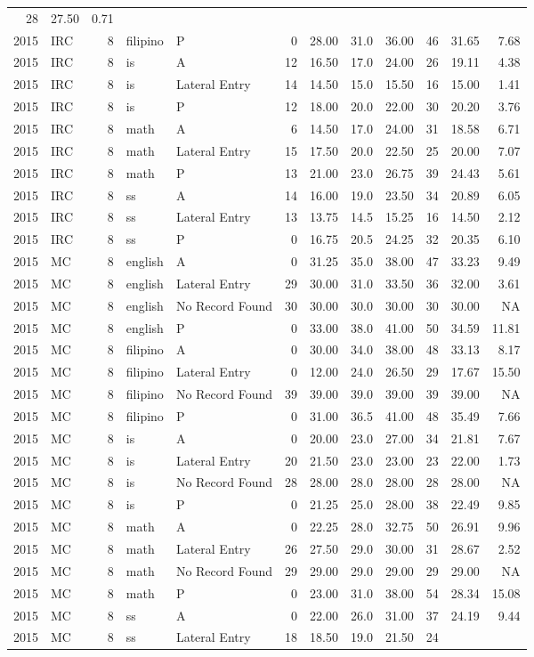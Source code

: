 \documentclass[]{article}
\begin{document}
\begin{longtable}[]{@{}rlrllrrrrrrr@{}}
28 & 27.50 & 0.71\tabularnewline
2015 & IRC & 8 & filipino & P & 0 & 28.00 & 31.0 & 36.00 & 46 & 31.65 &
7.68\tabularnewline
2015 & IRC & 8 & is & A & 12 & 16.50 & 17.0 & 24.00 & 26 & 19.11 &
4.38\tabularnewline
2015 & IRC & 8 & is & Lateral Entry & 14 & 14.50 & 15.0 & 15.50 & 16 &
15.00 & 1.41\tabularnewline
2015 & IRC & 8 & is & P & 12 & 18.00 & 20.0 & 22.00 & 30 & 20.20 &
3.76\tabularnewline
2015 & IRC & 8 & math & A & 6 & 14.50 & 17.0 & 24.00 & 31 & 18.58 &
6.71\tabularnewline
2015 & IRC & 8 & math & Lateral Entry & 15 & 17.50 & 20.0 & 22.50 & 25 &
20.00 & 7.07\tabularnewline
2015 & IRC & 8 & math & P & 13 & 21.00 & 23.0 & 26.75 & 39 & 24.43 &
5.61\tabularnewline
2015 & IRC & 8 & ss & A & 14 & 16.00 & 19.0 & 23.50 & 34 & 20.89 &
6.05\tabularnewline
2015 & IRC & 8 & ss & Lateral Entry & 13 & 13.75 & 14.5 & 15.25 & 16 &
14.50 & 2.12\tabularnewline
2015 & IRC & 8 & ss & P & 0 & 16.75 & 20.5 & 24.25 & 32 & 20.35 &
6.10\tabularnewline
2015 & MC & 8 & english & A & 0 & 31.25 & 35.0 & 38.00 & 47 & 33.23 &
9.49\tabularnewline
2015 & MC & 8 & english & Lateral Entry & 29 & 30.00 & 31.0 & 33.50 & 36
& 32.00 & 3.61\tabularnewline
2015 & MC & 8 & english & No Record Found & 30 & 30.00 & 30.0 & 30.00 &
30 & 30.00 & NA\tabularnewline
2015 & MC & 8 & english & P & 0 & 33.00 & 38.0 & 41.00 & 50 & 34.59 &
11.81\tabularnewline
2015 & MC & 8 & filipino & A & 0 & 30.00 & 34.0 & 38.00 & 48 & 33.13 &
8.17\tabularnewline
2015 & MC & 8 & filipino & Lateral Entry & 0 & 12.00 & 24.0 & 26.50 & 29
& 17.67 & 15.50\tabularnewline
2015 & MC & 8 & filipino & No Record Found & 39 & 39.00 & 39.0 & 39.00 &
39 & 39.00 & NA\tabularnewline
2015 & MC & 8 & filipino & P & 0 & 31.00 & 36.5 & 41.00 & 48 & 35.49 &
7.66\tabularnewline
2015 & MC & 8 & is & A & 0 & 20.00 & 23.0 & 27.00 & 34 & 21.81 &
7.67\tabularnewline
2015 & MC & 8 & is & Lateral Entry & 20 & 21.50 & 23.0 & 23.00 & 23 &
22.00 & 1.73\tabularnewline
2015 & MC & 8 & is & No Record Found & 28 & 28.00 & 28.0 & 28.00 & 28 &
28.00 & NA\tabularnewline
2015 & MC & 8 & is & P & 0 & 21.25 & 25.0 & 28.00 & 38 & 22.49 &
9.85\tabularnewline
2015 & MC & 8 & math & A & 0 & 22.25 & 28.0 & 32.75 & 50 & 26.91 &
9.96\tabularnewline
2015 & MC & 8 & math & Lateral Entry & 26 & 27.50 & 29.0 & 30.00 & 31 &
28.67 & 2.52\tabularnewline
2015 & MC & 8 & math & No Record Found & 29 & 29.00 & 29.0 & 29.00 & 29
& 29.00 & NA\tabularnewline
2015 & MC & 8 & math & P & 0 & 23.00 & 31.0 & 38.00 & 54 & 28.34 &
15.08\tabularnewline
2015 & MC & 8 & ss & A & 0 & 22.00 & 26.0 & 31.00 & 37 & 24.19 &
9.44\tabularnewline
2015 & MC & 8 & ss & Lateral Entry & 18 & 18.50 & 19.0 & 21.50 & 24 &

\end{longtable}
\end{document}
